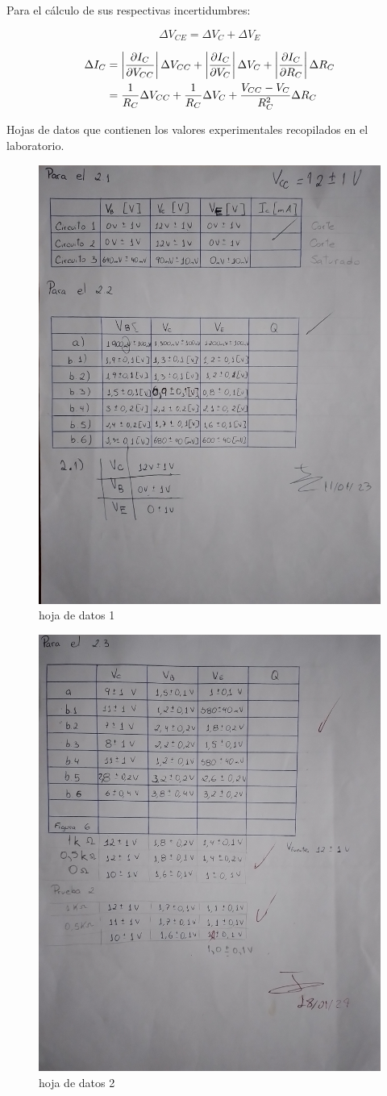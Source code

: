 \documentclass[10pt, a4paper]{article}
\begin{document}
    Para el cálculo de sus respectivas incertidumbres:

    \setcounter{equation}{1}
    \begin{equation}
        \Delta V_{CE} = \Delta V_C + \Delta V_E
        \label{Qeq3}
    \end{equation}

    \begin{equation}
        \begin{split}
            \Delta I_C & = \left | \frac{\partial I_C}{\partial V_{CC}} \right | \Delta V_{CC} + \left | \frac{\partial I_C}{\partial V_C} \right | \Delta V_C + \left | \frac{\partial I_C}{\partial R_C} \right | \Delta R_C \\
            & = {1 \over R_C} \Delta V_{CC} + {1 \over R_C} \Delta V_C + \frac{V_{CC}-V_C}{R_C^2} \Delta R_C
        \end{split}
        \label{Qeq4}
    \end{equation}

    \newpage

    Hojas de datos que contienen los valores experimentales recopilados en el laboratorio.

    \begin{figure}
        \centering
        \includegraphics[height=10cm\textwidth]{hojadatos1.jpg}
        \caption{hoja de datos 1}
        \label{fig:hd1}
    \end{figure}

    \begin{figure}
        \centering
        \includegraphics[height=10cm\textwidth]{hojadatos2.jpg}
        \caption{hoja de datos 2}
        \label{fig:hd2}
    \end{figure}
\end{document}
